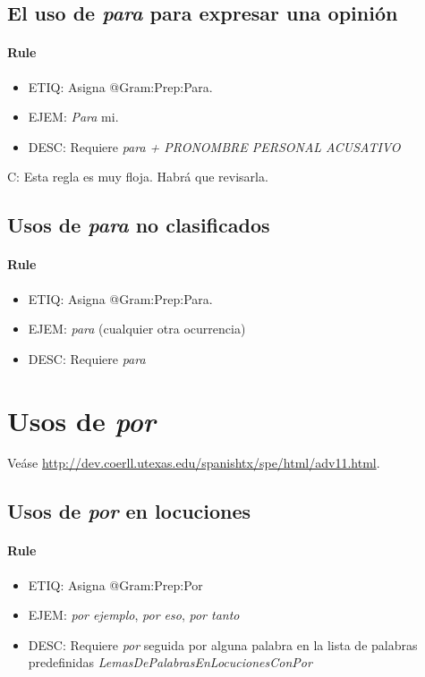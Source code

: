 \documentclass[11pt]{report}
\begin{document}
\subsection{El uso de \emph{para} para expresar una opinión}
\paragraph*{Rule}
\begin{itemize}
\item ETIQ: Asigna @Gram:Prep:Para.
\item EJEM: \emph{Para} mi.
\item DESC: Requiere \emph{para + PRONOMBRE PERSONAL ACUSATIVO}
\end{itemize}

 C: Esta regla es muy floja. Habrá que revisarla.
\subsection{Usos de \emph{para} no clasificados}
\paragraph*{Rule}
\begin{itemize}
\item ETIQ: Asigna @Gram:Prep:Para.
\item EJEM: \emph{para} (cualquier otra ocurrencia)
\item DESC: Requiere \emph{para}
\end{itemize}

\section{Usos de \emph{por}}
Veáse \url{http://dev.coerll.utexas.edu/spanishtx/spe/html/adv11.html}.

\subsection{Usos de \emph{por} en locuciones}
\paragraph*{Rule}
\begin{itemize}
\item ETIQ: Asigna @Gram:Prep:Por
\item EJEM: \emph{por ejemplo}, \emph{por eso}, \emph{por tanto}
\item DESC: Requiere \emph{por} seguida por alguna palabra en la lista de palabras predefinidas \emph{LemasDePalabrasEnLocucionesConPor}
\end{itemize}
\end{document}
